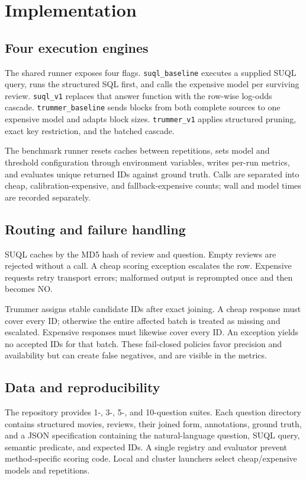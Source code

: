 \chapter{Implementation}
\section{Four execution engines}
The shared runner exposes four flags. \texttt{suql\_baseline} executes a supplied
SUQL query, runs the structured SQL first, and calls the expensive model per
surviving review. \texttt{suql\_v1} replaces that answer function with the row-wise
log-odds cascade. \texttt{trummer\_baseline} sends blocks from both complete sources
to one expensive model and adapts block sizes. \texttt{trummer\_v1} applies
structured pruning, exact key restriction, and the batched cascade.

The benchmark runner resets caches between repetitions, sets model and threshold
configuration through environment variables, writes per-run metrics, and evaluates
unique returned IDs against ground truth. Calls are separated into cheap,
calibration-expensive, and fallback-expensive counts; wall and model times are
recorded separately.

\section{Routing and failure handling}
SUQL caches by the MD5 hash of review and question. Empty reviews are rejected
without a call. A cheap scoring exception escalates the row. Expensive requests
retry transport errors; malformed output is reprompted once and then becomes NO.

Trummer assigns stable candidate IDs after exact joining. A cheap response must
cover every ID; otherwise the entire affected batch is treated as missing and
escalated. Expensive responses must likewise cover every ID. An exception yields
no accepted IDs for that batch. These fail-closed policies favor precision and
availability but can create false negatives, and are visible in the metrics.

\section{Data and reproducibility}
The repository provides 1-, 3-, 5-, and 10-question suites. Each question directory
contains structured movies, reviews, their joined form, annotations, ground truth,
and a JSON specification containing the natural-language question, SUQL query,
semantic predicate, and expected IDs. A single registry and evaluator prevent
method-specific scoring code. Local and cluster launchers select cheap/expensive
models and repetitions.

